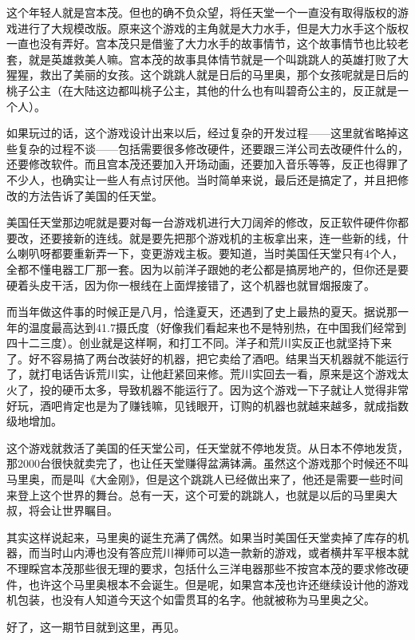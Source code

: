 \documentclass[
  letterpaper,
  DIV=11,
  numbers=noendperiod]{scrreprt}
\begin{document}
这个年轻人就是宫本茂。但也的确不负众望，将任天堂一个一直没有取得版权的游戏进行了大规模改版。原来这个游戏的主角就是大力水手，但是大力水手这个版权一直也没有弄好。宫本茂只是借鉴了大力水手的故事情节，这个故事情节也比较老套，就是英雄救美人嘛。宫本茂的故事具体情节就是一个叫跳跳人的英雄打败了大猩猩，救出了美丽的女孩。这个跳跳人就是日后的马里奥，那个女孩呢就是日后的桃子公主（在大陆这边都叫桃子公主，其他的什么也有叫碧奇公主的，反正就是一个人）。

如果玩过的话，这个游戏设计出来以后，经过复杂的开发过程------这里就省略掉这些复杂的过程不谈------包括需要很多修改硬件，还要跟三洋公司去改硬件什么的，还要修改软件。而且宫本茂还要加入开场动画，还要加入音乐等等，反正也得罪了不少人，也确实让一些人有点讨厌他。当时简单来说，最后还是搞定了，并且把修改的方法告诉了美国的任天堂。

美国任天堂那边呢就是要对每一台游戏机进行大刀阔斧的修改，反正软件硬件你都要改，还要接新的连线。就是要先把那个游戏机的主板拿出来，连一些新的线，什么喇叭呀都要重新弄一下，变更游戏主板。要知道，当时美国任天堂只有4个人，全都不懂电器工厂那一套。因为以前洋子跟她的老公都是搞房地产的，但你还是要硬着头皮干活，因为你一根线在上面焊接错了，这个机器也就冒烟报废了。

而当年做这件事的时候正是八月，恰逢夏天，还遇到了史上最热的夏天。据说那一年的温度最高达到41.7摄氏度（好像我们看起来也不是特别热，在中国我们经常到四十二三度）。创业就是这样啊，和打工不同。洋子和荒川实反正也就坚持下来了。好不容易搞了两台改装好的机器，把它卖给了酒吧。结果当天机器就不能运行了，就打电话告诉荒川实，让他赶紧回来修。荒川实回去一看，原来是这个游戏太火了，投的硬币太多，导致机器不能运行了。因为这个游戏一下子就让人觉得非常好玩，酒吧肯定也是为了赚钱嘛，见钱眼开，订购的机器也就越来越多，就成指数级地增加。

这个游戏就救活了美国的任天堂公司，任天堂就不停地发货。从日本不停地发货，那2000台很快就卖完了，也让任天堂赚得盆满钵满。虽然这个游戏那个时候还不叫马里奥，而是叫《大金刚》，但是这个跳跳人已经做出来了，他还是需要一些时间来登上这个世界的舞台。总有一天，这个可爱的跳跳人，也就是以后的马里奥大叔，将会让世界瞩目。

其实这样说起来，马里奥的诞生充满了偶然。如果当时美国任天堂卖掉了库存的机器，而当时山内溥也没有答应荒川禅师可以造一款新的游戏，或者横井军平根本就不理睬宫本茂那些很无理的要求，包括什么三洋电器那些不按宫本茂的要求修改硬件，也许这个马里奥根本不会诞生。但是呢，如果宫本茂也许还继续设计他的游戏机包装，也没有人知道今天这个如雷贯耳的名字。他就被称为马里奥之父。

好了，这一期节目就到这里，再见。
\end{document}
